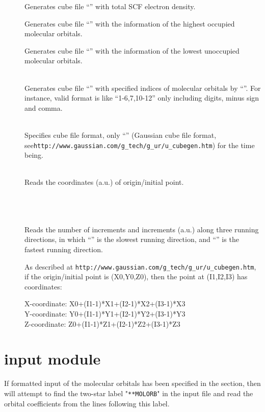 \begin{description}
\item[]
  Generates cube file ``'' with total SCF electron density.

\item[]
  Generates cube file ``'' with the information of the highest
occupied molecular orbitals.

\item[]
  Generates cube file ``'' with the information of the lowest
unoccupied molecular orbitals.

\item[]
   \\
  Generates cube file ``'' with specified indices of molecular orbitals
by ``''. For instance, valid format is like ``1-6,7,10-12'' only including
digits, minus sign and comma.

\item[]
   \\
  Specifies cube file format, only ``'' (Gaussian cube file format,
see\linebreak \verb|http://www.gaussian.com/g_tech/g_ur/u_cubegen.htm|) for the
time being.

\item[]
   \\
  Reads the coordinates (a.u.) of origin/initial point.

\item[]
   \\
   \\
   \\
  Reads the number of increments and increments (a.u.) along three running directions,
in which ``'' is the slowest running direction, and ``''
is the fastest running direction.

As described at \verb|http://www.gaussian.com/g_tech/g_ur/u_cubegen.htm|, if the
origin/initial point is (X0,Y0,Z0), then the point at (I1,I2,I3) has coordinates:

X-coordinate: X0+(I1-1)*X1+(I2-1)*X2+(I3-1)*X3\\
Y-coordinate: Y0+(I1-1)*Y1+(I2-1)*Y2+(I3-1)*Y3\\
Z-coordinate: Z0+(I1-1)*Z1+(I2-1)*Z2+(I3-1)*Z3
\end{description}


\pagebreak[3]
\section{\label{sec:ref-molorbinp}  input module}

If formatted input of the molecular orbitals has been specified in
the  section, then {\sir} will attempt to find
the two-star label "\verb|**MOLORB|" in the input file and read
the orbital coefficients from the lines following this label.
